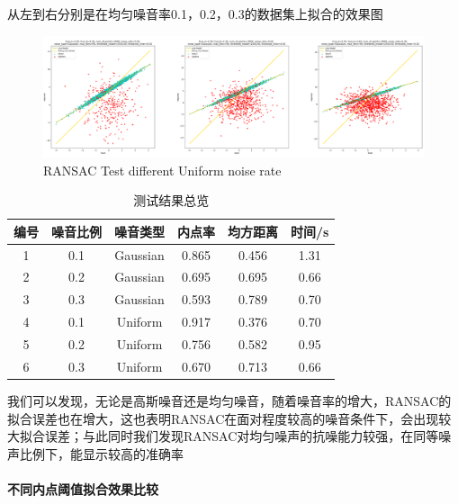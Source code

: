 \documentclass{seuer}
\begin{document}
从左到右分别是在均匀噪音率0.1，0.2，0.3的数据集上拟合的效果图
\begin{figure}[H]
  \centering
  \includegraphics[scale=0.1]{./image/test_noise_rate_Gaussian.png}
  \caption{RANSAC Test different Uniform noise rate} \label{fig:eg}
\end{figure}
\begin{table}[h]
  \centering
  \captionnamefont{\wuhao\bf\heiti}
  \captiontitlefont{\wuhao\bf\heiti}
  \caption{测试结果总览} \label{tab:eg1}
  \liuhao
  \begin{tabular}{cccccc}
  \toprule
  {编号} & {噪音比例} & {噪音类型} & {内点率} & {均方距离} & {时间/s} \\
  \midrule 
  1 & 0.1 & Gaussian & 0.865 & 0.456 & 1.31 \\
  2 & 0.2 & Gaussian & 0.695 & 0.695 & 0.66 \\
  3 & 0.3 & Gaussian & 0.593 & 0.789 & 0.70\\
  4 & 0.1 & Uniform  & 0.917 & 0.376 & 0.70\\
  5 & 0.2 & Uniform  & 0.756 & 0.582 & 0.95\\
  6 & 0.3 & Uniform  & 0.670 & 0.713 & 0.66\\
  \bottomrule
  \end{tabular}
\end{table}
我们可以发现，无论是高斯噪音还是均匀噪音，随着噪音率的增大，RANSAC的拟合误差也在增大，这也表明RANSAC在面对程度较高的噪音条件下，会出现较大拟合误差；与此同时我们发现RANSAC对均匀噪声的抗噪能力较强，在同等噪声比例下，能显示较高的准确率

\paragraph{不同内点阈值拟合效果比较}
\end{document}
